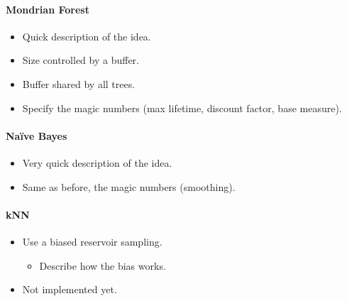 \paragraph{Mondrian Forest~\cite{mondrian2014}}
\begin{itemize}
	\item Quick description of the idea.
	\item Size controlled by a buffer.
	\item Buffer shared by all trees.
	\item Specify the magic numbers (max lifetime, discount factor, base measure).
\end{itemize}
\paragraph{Naïve Bayes~\cite{naive_bayes}}
\begin{itemize}
	\item Very quick description of the idea.
	\item Same as before, the magic numbers (smoothing).
\end{itemize}
\paragraph{kNN~\cite{biased_reservoir_sampling}}
\begin{itemize}
	\item Use a biased reservoir sampling.
	\begin{itemize}
		\item Describe how the bias works.
	\end{itemize}
	\item Not implemented yet.
\end{itemize}

